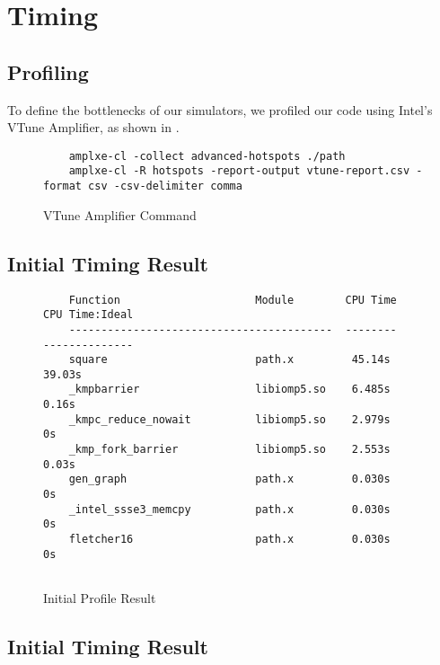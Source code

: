 \section{Timing}\label{sec:timing}
\subsection{Profiling}
To define the bottlenecks of our simulators, we profiled our code
using Intel's VTune Amplifier, as shown in .

\begin{figure}[h]
	\footnotesize
	\begin{verbatim}
	amplxe-cl -collect advanced-hotspots ./path
    amplxe-cl -R hotspots -report-output vtune-report.csv -format csv -csv-delimiter comma

	\end{verbatim}
	\caption{VTune Amplifier Command}
	\label{fig:amplxe-command}
\end{figure}

\subsection{Initial Timing Result}

\begin{figure}[h]
	\footnotesize
	\begin{verbatim}
	Function                     Module        CPU Time		CPU Time:Ideal
	-----------------------------------------  --------     --------------
	square			             path.x         45.14s			39.03s
	_kmpbarrier                  libiomp5.so    6.485s			 0.16s
	_kmpc_reduce_nowait          libiomp5.so    2.979s			 	0s
	_kmp_fork_barrier            libiomp5.so    2.553s			 0.03s
	gen_graph             		 path.x         0.030s				0s
	_intel_ssse3_memcpy          path.x         0.030s				0s
	fletcher16                   path.x         0.030s				0s
	
	\end{verbatim}
	\caption{Initial Profile Result}
	\label{fig:initial-profile-result}
\end{figure}

\subsection{Initial Timing Result}
